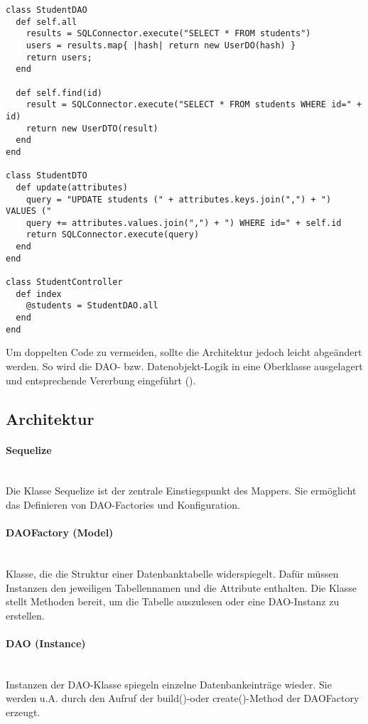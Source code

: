 \hspace{1pt}
\begin{lstlisting}[caption=Objektrelationale Zugriffsschicht]
class StudentDAO
  def self.all
    results = SQLConnector.execute("SELECT * FROM students")
    users = results.map{ |hash| return new UserDO(hash) }
    return users;
  end
  
  def self.find(id)
    result = SQLConnector.execute("SELECT * FROM students WHERE id=" + id)
    return new UserDTO(result)
  end
end

class StudentDTO
  def update(attributes)
    query = "UPDATE students (" + attributes.keys.join(",") + ") VALUES ("
    query += attributes.values.join(",") + ") WHERE id=" + self.id
    return SQLConnector.execute(query)
  end
end

class StudentController
  def index
    @students = StudentDAO.all
  end
end
\end{lstlisting}

\noindent Um doppelten Code zu vermeiden, sollte die Architektur jedoch leicht abgeändert werden. So wird die DAO- bzw. Datenobjekt-Logik in eine Oberklasse ausgelagert und entsprechende Vererbung eingeführt (\cite[S. 11]{Depo1}).


\subsection{Architektur}

\paragraph{Sequelize} \hspace{0pt} \\
Die Klasse Sequelize ist der zentrale Einstiegspunkt des Mappers. Sie ermöglicht das Definieren von DAO-Factories und Konfiguration.

\paragraph{DAOFactory (Model)} \hspace{0pt} \\
Klasse, die die Struktur einer Datenbanktabelle widerspiegelt. Dafür müssen Instanzen den jeweiligen Tabellennamen und die Attribute enthalten. Die Klasse stellt Methoden bereit, um die Tabelle auszulesen oder eine DAO-Instanz zu erstellen.

\paragraph{DAO (Instance)} \hspace{0pt} \\
Instanzen der DAO-Klasse spiegeln einzelne Datenbankeinträge wieder. Sie werden u.A. durch den Aufruf der build()-oder create()-Method der DAOFactory erzeugt.


